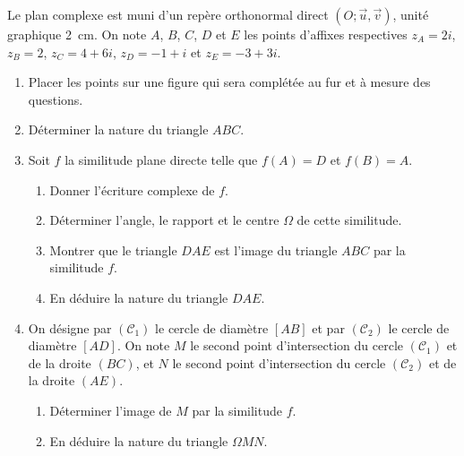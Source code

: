 \begin{exo}
      Le plan complexe est muni d'un repère orthonormal direct 
      $( O ; \vec{u} , \vec{v} )$, unité graphique 2~cm. 
      On note $A$, $B$, $C$, $D$ et $E$ les points d’affixes respectives 
      $z_A = 2 i$, $z_B = 2$, $z_C = 4 + 6i$, $z_D = -1 + i$ et $z_E = -3 + 3i$.
      \begin{enumerate}
            \item Placer les points sur une figure qui sera complétée au fur et à mesure des questions.
            \item Déterminer la nature du triangle $ABC$.
            \item Soit $f$ la similitude plane directe telle que $f(A) = D$ et $f(B) = A$.
                  \begin{enumerate}
                        \item Donner l’écriture complexe de $f$.
                        \item Déterminer l’angle, le rapport et le centre $\Omega$ de cette similitude.
                        \item Montrer que le triangle $DAE$ est l’image du triangle $ABC$ par la similitude $f$.
                        \item En déduire la nature du triangle $DAE$.
                  \end{enumerate}
            \item On désigne par $(\mathscr{C}_1)$ le cercle de diamètre $[AB]$ et
                  par $(\mathscr{C}_2)$ le cercle de diamètre $[AD]$.
                  On note $M$ le second point d’intersection du cercle $(\mathscr{C}_1)$ et de la droite $(BC)$, 
                  et $N$ le second point d’intersection du cercle $(\mathscr{C}_2)$ et de la droite $(AE)$.
                  \begin{enumerate}
                        \item Déterminer l’image de $M$ par la similitude $f$.
                        \item En déduire la nature du triangle $\Omega MN$.
                  \end{enumerate}
      \end{enumerate}
\end{exo}
%
